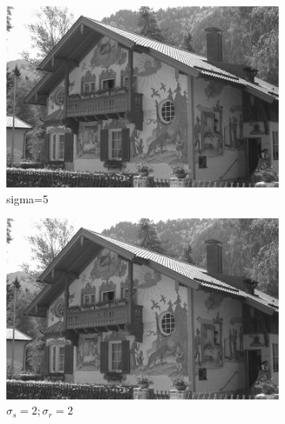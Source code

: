 \documentclass[12pt]{article}
\begin{document}
\begin{figure}[h]
    \centering
    \begin{subfigure}[b]{0.24\textwidth}
        \centering
        \includegraphics[width=\textwidth]{../images/noisy_kodak_5.png}
        \caption{sigma=5}
        \label{Noisy (sigma=5)}
    \end{subfigure}
    \begin{subfigure}[b]{0.24\textwidth}
        \centering
        \includegraphics[width=\textwidth]{../images/filtered_kodak_5_sigma_s_2_sigma_r_2.png}
        \caption{$\sigma_s=2;\sigma_r=2$}
        \label{fig:subfig2}
    \end{subfigure}
    \begin{subfigure}[b]{0.24\textwidth}
        \centering

\end{subfigure}
\end{figure}
\end{document}
